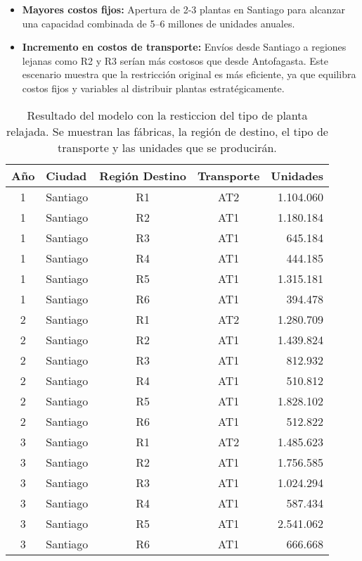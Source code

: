 \documentclass[a4paper]{article}
\begin{document}
\begin{enumerate}
        \begin{itemize}
            \item \textbf{Mayores costos fijos:} Apertura de 2-3 plantas en Santiago para alcanzar una capacidad combinada de 5–6 millones de unidades anuales.

            \item \textbf{Incremento en costos de transporte:} Envíos desde Santiago a regiones lejanas como R2 y R3 serían más costosos que desde Antofagasta.
            Este escenario muestra que la restricción original es más eficiente, ya que equilibra costos fijos y variables al distribuir plantas estratégicamente.

        \end{itemize}

        \begin{table}[H]
            \centering
            \begin{tabular}{|c|l|c|c|r|}
            \hline
            \textbf{Año} & \textbf{Ciudad} & \textbf{Región Destino} & \textbf{Transporte} & \textbf{Unidades} \\
            \hline
            1 & Santiago & R1 & AT2 & 1.104.060 \\
            1 & Santiago & R2 & AT1 & 1.180.184 \\
            1 & Santiago & R3 & AT1 & 645.184 \\
            1 & Santiago & R4 & AT1 & 444.185 \\
            1 & Santiago & R5 & AT1 & 1.315.181 \\
            1 & Santiago & R6 & AT1 & 394.478 \\
            \hline\hline
            2 & Santiago & R1 & AT2 & 1.280.709 \\
            2 & Santiago & R2 & AT1 & 1.439.824 \\
            2 & Santiago & R3 & AT1 & 812.932 \\
            2 & Santiago & R4 & AT1 & 510.812 \\
            2 & Santiago & R5 & AT1 & 1.828.102 \\
            2 & Santiago & R6 & AT1 & 512.822 \\
            \hline\hline
            3 & Santiago & R1 & AT2 & 1.485.623 \\
            3 & Santiago & R2 & AT1 & 1.756.585 \\
            3 & Santiago & R3 & AT1 & 1.024.294 \\
            3 & Santiago & R4 & AT1 & 587.434 \\
            3 & Santiago & R5 & AT1 & 2.541.062 \\
            3 & Santiago & R6 & AT1 & 666.668 \\
            \hline
            \end{tabular}
            \caption{Resultado del modelo con la resticcion del tipo de planta relajada. Se muestran las fábricas, la región de destino, el tipo de transporte y las unidades que se producirán.}
            \label{tab:transporte}
        \end{table}


\end{enumerate}
\end{document}
